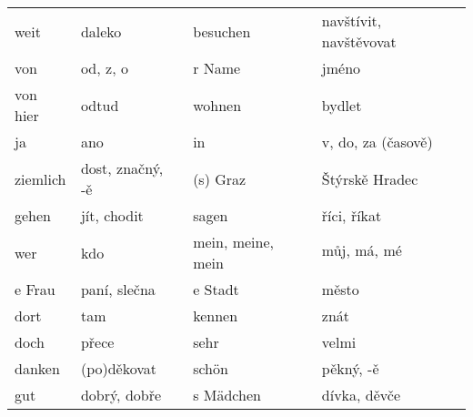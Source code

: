 \begin{widetext}
\begin{tabular}{llll}
      weit        & daleko            & besuchen          & navštívit, navštěvovat            \\
      von         & od, z, o          & r Name            & jméno                             \\
      von hier    & odtud             & wohnen            & bydlet                            \\
      ja          & ano               & in                & v, do, za (časově)                \\
      ziemlich    & dost, značný, -ě  & (s) Graz          & Štýrskě Hradec                    \\
      gehen       & jít, chodit       & sagen             & říci, říkat                       \\
      wer         & kdo               & mein, meine, mein & můj, má, mé                      \\
      e Frau      & paní, slečna      & e Stadt           & město                             \\
      dort        & tam               & kennen            & znát                              \\
      doch        & přece             & sehr              & velmi                             \\
      danken      & (po)děkovat       & sch{\"o}n         & pěkný, -ě                         \\
      gut         & dobrý, dobře      & s M{\"a}dchen     & dívka, děvče \\
      \hline
    \end{tabular}
  \end{widetext}
  
